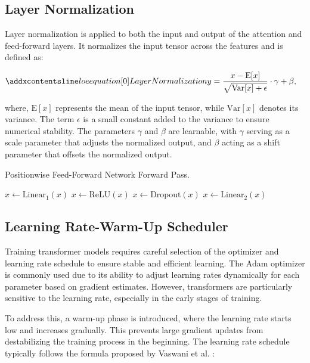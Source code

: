 \subsection{Layer Normalization}
\label{sec:laynorm}
Layer normalization is applied to both the input and output of the attention and feed-forward layers. It normalizes the input tensor across the features and is defined as:

\begin{align}
\setequationentry{Layer Normalization}
    y &= \frac{x - \text{E}[x]}{\sqrt{\text{Var}[x] + \epsilon}} \cdot \gamma + \beta,
\end{align}

where, \( \text{E}[x] \) represents the mean of the input tensor, while \( \text{Var}[x] \) denotes its variance. The term \( \epsilon \) is a small constant added to the variance to ensure numerical stability. The parameters \( \gamma \) and \( \beta \) are learnable, with \( \gamma \) serving as a scale parameter that adjusts the normalized output, and \( \beta \) acting as a shift parameter that offsets the normalized output.

\begin{algorithm}[H]
\caption{Positionwise Feed-Forward Network Forward Pass.}
\label{alg:ffn2}
$x \gets \text{Linear}_1(x)$\;
$x \gets \text{ReLU}(x)$\;
$x \gets \text{Dropout}(x)$\;
$x \gets \text{Linear}_2(x)$\;
\end{algorithm}



\subsection{Learning Rate-Warm-Up Scheduler}
\label{sec:scheduler}

Training transformer models requires careful selection of the optimizer and learning rate schedule to ensure stable and efficient learning. The Adam \cite{adam} optimizer is commonly used due to its ability to adjust learning rates dynamically for each parameter based on gradient estimates. However, transformers are particularly sensitive to the learning rate, especially in the early stages of training.

To address this, a warm-up phase is introduced, where the learning rate starts low and increases gradually. This prevents large gradient updates from destabilizing the training process in the beginning. The learning rate schedule typically follows the formula proposed by Vaswani et al. \cite{transformer}:

